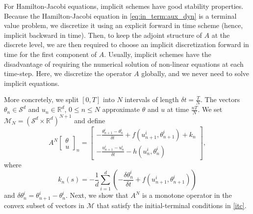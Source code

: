 \documentclass[12pt]{amsart}
\newcommand{\Rr}{{\mathbb{R}}}
\newcommand{\1}{{\chi}}
\newcommand{\lb}{\left(}
\newcommand{\rb}{\right)}
\newcommand{\Ss}{\mathcal{S}}
\theoremstyle{definition}
\begin{document}
        For Hamilton-Jacobi equations, implicit schemes have good stability properties. 
		Because the Hamilton-Jacobi equation in \eqref{eq:in_term:aux_dyn} is a terminal value problem, we discretize it using an explicit forward in time scheme (hence, implicit backward in time). 
		Then, to keep the adjoint structure of $A$ at the discrete level, we are then required to choose an implicit discretization forward in time for the first component of $A$.
        Usually, implicit schemes have the disadvantage of requiring the numerical solution of non-linear equations at each time-step. 
		Here, we discretize the operator $A$ globally, and we never need to solve implicit equations. 
        
        More concretely, we split $[0,T]$ into $N$ intervals of length  $\delta t=\frac T N$. 
        The vectors $\theta_n\in \Ss^d$ and $u_n\in \Rr^d$, $0\leq n\leq N$ approximate $\theta$ and $u$ at time $\frac{nT}N$. 
        We set $\mathcal{M}_N=(\Ss^d\times \Rr^{d})^{N+1}$ and define
        \begin{equation} \label{disc_probl}
        A^N\left[\begin{array}{c}
        \theta\\
        u
        \end{array}\right]_n
        =
        \left[\begin{array}{c}
         -\frac{\theta_{n+1}^i-\theta_n^i}{\delta t}+f(u_{n+1}^i,\theta_{n+1}^i) + k_n\\ 
         -\frac{u_{n+1}^i-u_n^i}{\delta t}-h(u_{n}^i,\theta_{n}^i)
        \end{array}\right],
        \end{equation}
        where 
        \begin{equation*}
                k_n(s) = -\frac{1}{d} \sum_{i=1}^d \lb -\frac{\delta \theta^i_n}{\delta t} + f(u_{n+1}^i,\theta_{n+1}^i)\rb
        \end{equation*}
                and $\delta \theta^i_n = \theta_{n+1}^i-\theta_n^i$.
Next, we show that $A^N$ is a monotone operator in the convex subset of vectors in $\mathcal{M}$ that satisfy the initial-terminal conditions in \eqref{itc}.
\end{document}
